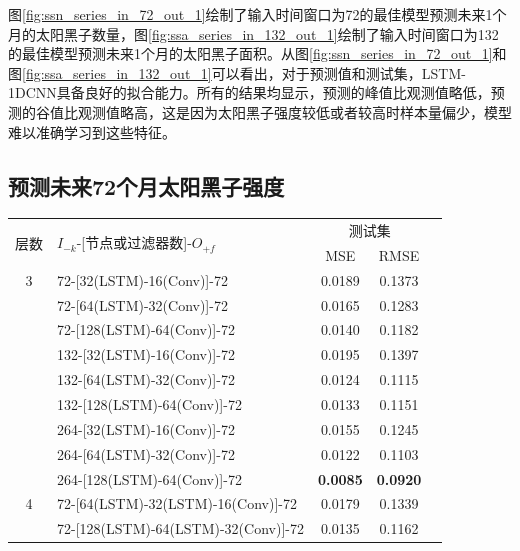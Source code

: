 图\ref{fig:ssn_series_in_72_out_1}绘制了输入时间窗口为72的最佳模型预测未来1个月的太阳黑子数量，图\ref{fig:ssa_series_in_132_out_1}绘制了输入时间窗口为132的最佳模型预测未来1个月的太阳黑子面积。从图\ref{fig:ssn_series_in_72_out_1}和图\ref{fig:ssa_series_in_132_out_1}可以看出，对于预测值和测试集，LSTM-1DCNN具备良好的拟合能力。所有的结果均显示，预测的峰值比观测值略低，预测的谷值比观测值略高，这是因为太阳黑子强度较低或者较高时样本量偏少，模型难以准确学习到这些特征。

\subsection{预测未来72个月太阳黑子强度}\label{sec:ss_result_72}

\begin{table}[!htbp]
  \centering
  \label{tab:ss_number_out_72}
  \footnotesize
  \renewcommand{\arraystretch}{1}
  \begin{tabular}{clccc}
    \toprule
    \multirow{2}{*}{层数} & \multirow{2}{*}{$I_{-k}$-[节点或过滤器数]-$O_{+f}$} & \multicolumn{2}{c}{测试集}\\
    \cmidrule(lr){3-4}
    \noalign{\smallskip}
    & & MSE & RMSE\\
    \midrule 
    3 & 72-[32(LSTM)-16(Conv)]-72 & 0.0189 & 0.1373 \\ 
      & 72-[64(LSTM)-32(Conv)]-72 & 0.0165 & 0.1283 \\
      & 72-[128(LSTM)-64(Conv)]-72 & 0.0140 & 0.1182 \\
      & 132-[32(LSTM)-16(Conv)]-72 & 0.0195 & 0.1397 \\
      & 132-[64(LSTM)-32(Conv)]-72 & 0.0124 & 0.1115 \\
      & 132-[128(LSTM)-64(Conv)]-72 & 0.0133 & 0.1151 \\
      & 264-[32(LSTM)-16(Conv)]-72 & 0.0155 & 0.1245 \\
      & 264-[64(LSTM)-32(Conv)]-72 & 0.0122 & 0.1103 \\
      & 264-[128(LSTM)-64(Conv)]-72 & \textbf{0.0085} & \textbf{0.0920} \\
    \hline
    4 & 72-[64(LSTM)-32(LSTM)-16(Conv)]-72 & 0.0179 & 0.1339 \\
      & 72-[128(LSTM)-64(LSTM)-32(Conv)]-72 & 0.0135 & 0.1162  \\

\end{tabular}
\end{table}
